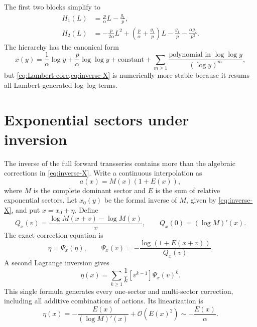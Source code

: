 \documentclass[11pt]{article}
\theoremstyle{definition}
\theoremstyle{remark}
\newcommand{\BigO}{\mathcal O}
\begin{document}
The first two blocks simplify to
\begin{align}
 H_1(L)
 &=\frac p\alpha L-\frac{g_1}{p},
 \label{eq:H1}\\
 H_2(L)
 &=-\frac p{2\alpha}L^2
   +\left(\frac p\alpha+\frac{g_1}{p}\right)L
   -\frac{g_1}{p}-\frac{\alpha g_2}{p^2}.
 \label{eq:H2}
\end{align}
The hierarchy has the canonical form
\[
 x(y)=\frac1\alpha\log y
      +\frac p\alpha\log\log y
      +\text{constant}
      +\sum_{m\geq1}
        \frac{\text{polynomial in }\log\log y}
             {(\log y)^m},
\]
but \cref{eq:Lambert-core,eq:inverse-X} is numerically more stable because it
resums all Lambert-generated log--log terms.

\section{Exponential sectors under inversion}
\label{sec:inverse-exponential}

The inverse of the full forward transseries contains more than the algebraic
corrections in \cref{eq:inverse-X}.  Write a continuous interpolation as
\begin{equation}
 a(x)=M(x)(1+E(x)),
 \label{eq:M-E}
\end{equation}
where $M$ is the complete dominant sector and $E$ is the sum of relative
exponential sectors.  Let $x_0(y)$ be the formal inverse of $M$, given by
\cref{eq:inverse-X}, and put $x=x_0+\eta$.  Define
\begin{equation}
 Q_x(v)=\frac{\log M(x+v)-\log M(x)}{v},
 \qquad Q_x(0)=(\log M)'(x).
 \label{eq:Qx}
\end{equation}
The exact correction equation is
\begin{equation}
 \eta=\Psi_x(\eta),
 \qquad
 \Psi_x(v)=-\frac{\log(1+E(x+v))}{Q_x(v)}.
 \label{eq:Psi-exponential}
\end{equation}
A second Lagrange inversion gives
\begin{equation}
 \boxed{
 \eta(x)=\sum_{k\geq1}\frac1k[v^{k-1}]\Psi_x(v)^k.}
 \label{eq:eta-master}
\end{equation}
This single formula generates every one-sector and multi-sector correction,
including all additive combinations of actions.  Its linearization is
\begin{equation}
 \eta(x)=-\frac{E(x)}{(\log M)'(x)}+\BigO(E(x)^2)
       \sim-\frac{E(x)}\alpha.
 \label{eq:eta-leading}
\end{equation}
\end{document}
